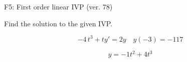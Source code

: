 \begin{exercise}
  \begin{exerciseTitle}F5: First order linear IVP (ver. 78)\end{exerciseTitle}
  \begin{exerciseStatement}
    
Find the solution to the given IVP.

    
\[-4 \, t^{3} +ty'= 2 y \hspace{1em} y( -3 ) = -117\]

  \end{exerciseStatement}
  \begin{exerciseAnswer}
    
\[y= -1 t^ 2 +4 t^{3}\]

  \end{exerciseAnswer}
\end{exercise}